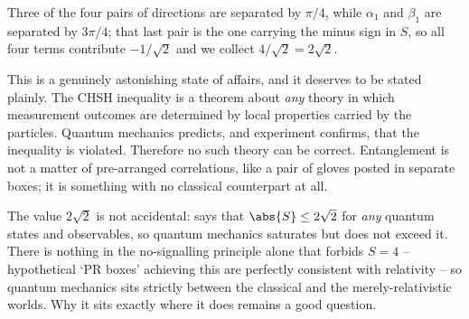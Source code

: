 \begin{center}
\end{center}

Three of the four pairs of directions are separated by $\pi/4$, while $\alpha_1$ and $\beta_1$ are separated by $3\pi/4$; that last pair is the one carrying the minus sign in $S$, so all four terms contribute $-1/\sqrt2$ and we collect $4/\sqrt2 = 2\sqrt2$.

This is a genuinely astonishing state of affairs, and it deserves to be stated plainly. The CHSH inequality is a theorem about \emph{any} theory in which measurement outcomes are determined by local properties carried by the particles. Quantum mechanics predicts, and experiment confirms, that the inequality is violated. Therefore no such theory can be correct. Entanglement is not a matter of pre-arranged correlations, like a pair of gloves posted in separate boxes; it is something with no classical counterpart at all.

\begin{remark}
	The value $2\sqrt2$ is not accidental:  says that $\abs{S}\leq 2\sqrt2$ for \emph{any} quantum states and observables, so quantum mechanics saturates but does not exceed it. There is nothing in the no-signalling principle alone that forbids $S = 4$ -- hypothetical `PR boxes' achieving this are perfectly consistent with relativity -- so quantum mechanics sits strictly between the classical and the merely-relativistic worlds. Why it sits exactly where it does remains a good question.
\end{remark}

